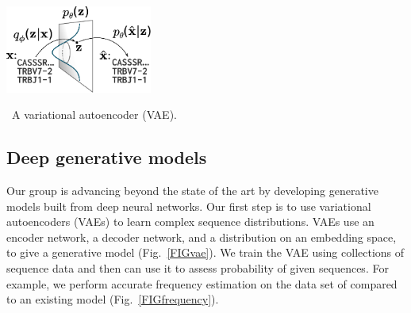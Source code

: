 \documentclass[nobib]{tufte-handout}
\begin{document}
\begin{marginfigure}[-1.5in]%
\begin{centering}
    \includegraphics[width=1.9in]{figures/vae.pdf}
\end{centering}
  \caption{\
    A variational autoencoder (VAE).
    }
  \label{FIGvae}
\end{marginfigure}%



\subsection*{Deep generative models}
Our group is advancing beyond the state of the art by developing generative models built from deep neural networks.
Our first step is to use variational autoencoders (VAEs) \cite{Kingma2014-mo} to learn complex sequence distributions.
VAEs use an encoder network, a decoder network, and a distribution on an embedding space, to give a generative model (Fig.~\ref{FIGvae}).
We train the VAE using collections of sequence data and then can use it to assess probability of given sequences.
For example, we perform accurate frequency estimation on the data set of \cite{Emerson2017-co} compared to an existing model (Fig.~\ref{FIGfrequency}).
\end{document}
